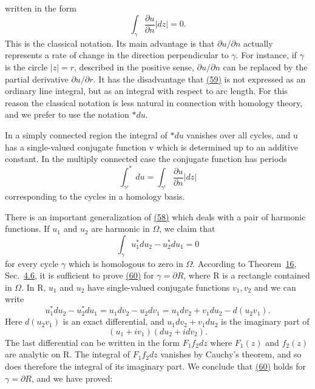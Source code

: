 written in the form
\begin{equation*}
\int_ {\gamma} \frac {\partial u}{\partial n} | d z | = 0.\tag{59}\label{eq:4.59}
\end{equation*}
This is the classical notation. Its main advantage is that $\partial u/\partial n$ actually represents a rate of change in the direction perpendicular to $\gamma$. For instance, if $\gamma$ is the circle $|z| = r$, described in the positive sense, $\partial u/\partial n$ can be replaced by the partial derivative $\partial u/\partial r$. It has the disadvantage that \hyperref[eq:4.59]{(59)} is not expressed as an ordinary line integral, but as an integral with respect to arc length. For this reason the classical notation is less natural in connection with homology theory, and we prefer to use the notation $*du$.

In a simply connected region the integral of $*du$ vanishes over all cycles, and u has a single-valued conjugate function v which is determined up to an additive constant. In the multiply connected case the conjugate function has periods
\begin{equation*}
\int_ {\gamma^ {i}} ^ {*} d u = \int_ {\gamma^ {i}} \frac {\partial u}{\partial n} | d z |
\end{equation*}
corresponding to the cycles in a homology basis.

There is an important generalization of \hyperref[eq:4.58]{(58)} which deals with a pair of harmonic functions. If $u_{1}$ and $u_{2}$ are harmonic in $\Omega$, we claim that
\begin{equation*}
\int_ {\gamma} u _ {1} ^ {*} d u _ {2} - u _ {2} ^ {*} d u _ {1} = 0\tag{60}\label{eq:4.60}
\end{equation*}
for every cycle $\gamma$ which is homologous to zero in $\Omega$. According to Theorem~\hyperref[thm:4.16]{16}, Sec.~\hyperref[sec:4.4.6]{4.6}, it is sufficient to prove \hyperref[eq:4.60]{(60)} for $\gamma = \partial R$, where R is a rectangle contained in $\Omega$. In R, $u_{1}$ and $u_{2}$ have single-valued conjugate functions $v_{1}, v_{2}$ and we can write
\begin{equation*}
u _ {1} ^ {*} d u _ {2} - u _ {2} ^ {*} d u _ {1} = u _ {1} d v _ {2} - u _ {2} d v _ {1} = u _ {1} d v _ {2} + v _ {1} d u _ {2} - d \left(u _ {2} v _ {1}\right).
\end{equation*}
Here $d(u_{2}v_{1})$ is an exact differential, and $u_{1}dv_{2} + v_{1}du_{2}$ is the imaginary part of
\begin{equation*}
(u _ {1} + i v _ {1}) (d u _ {2} + i d v _ {2}).
\end{equation*}
The last differential can be written in the form $F_{1}f_{2} dz$ where $F_{1}(z)$ and $f_{2}(z)$ are analytic on R. The integral of $F_{1}f_{2} dz$ vanishes by Cauchy's theorem, and so does therefore the integral of its imaginary part. We conclude that \hyperref[eq:4.60]{(60)} holds for $\gamma = \partial R$, and we have proved:

